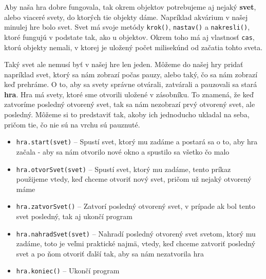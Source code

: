 





Aby naša hra dobre fungovala, tak okrem objektov potrebujeme aj nejaký \textbf{svet}, alebo viaceré svety, do ktorých tie objekty dáme. Napríklad akvárium v našej minulej hre bolo svet. Svet má svoje metódy \texttt{krok()}, \texttt{nastav()} a \texttt{nakresli()}, ktoré fungujú v podstate tak, ako u objektov. Okrem toho má aj vlastnosť \texttt{cas}, ktorú objekty nemali, v ktorej je uložený počet milisekúnd od začatia tohto sveta.

Taký svet ale nemusí byť v našej hre len jeden. Môžeme do našej hry pridať napríklad svet, ktorý sa nám zobrazí počas pauzy, alebo taký, čo sa nám zobrazí keď prehráme. O to, aby sa svety správne otvárali, zatvárali a pauzovali sa stará \textbf{hra}. Hra má svety, ktoré sme otvorili uložené v zásobníku. To znamená, že keď zatvoríme posledný otvorený svet, tak sa nám nezobrazí prvý otvorený svet, ale posledný. Môžeme si to predstaviť tak, akoby ich jednoducho ukladal na seba, pričom tie, čo nie sú na vrchu sú pauznuté.

\begin{itemize}
	\item \texttt{hra.start(svet)} -- Spustí svet, ktorý mu zadáme a postará sa o to, aby hra začala - aby sa nám otvorilo nové okno a spustilo sa všetko čo malo
	
	\item \texttt{hra.otvorSvet(svet)} -- Spustí svet, ktorý mu zadáme, tento príkaz použijeme vtedy, keď chceme otvoriť nový svet, pričom už nejaký otvorený máme
	
	\item \texttt{hra.zatvorSvet()} -- Zatvorí posledný otvorený svet, v prípade ak bol tento svet posledný, tak aj ukončí program
	
	\item \texttt{hra.nahradSvet(svet)} -- Nahradí posledný otvorený svet svetom, ktorý mu zadáme, toto je veľmi praktické najmä, vtedy, keď chceme zatvoriť posledný svet a po ňom otvoriť ďalší tak, aby sa nám nezatvorila hra
	
	\item \texttt{hra.koniec()} -- Ukončí program
	
\end{itemize}

